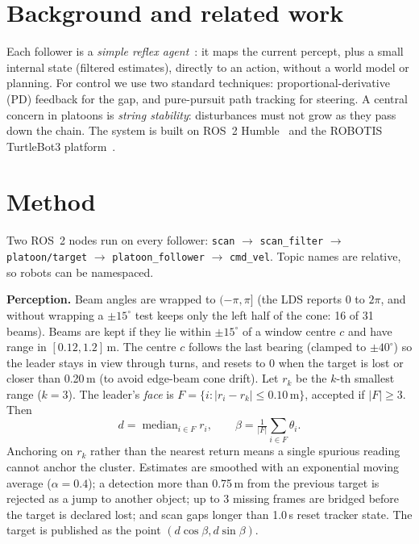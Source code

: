 \documentclass[11pt,a4paper,twocolumn]{article}
\begin{document}
\section{Background and related work}
Each follower is a \emph{simple reflex agent}~\cite{russell2021aima}: it maps the current
percept, plus a small internal state (filtered estimates), directly to an action, without a
world model or planning. For control we use two standard techniques: proportional-derivative
(PD) feedback for the gap, and pure-pursuit path tracking for steering. A central concern in
platoons is \emph{string stability}: disturbances must not grow as they pass down the chain.
The system is built on ROS~2 Humble~\cite{ros2docs} and the ROBOTIS TurtleBot3
platform~\cite{turtlebot3manual}.

\section{Method}
Two ROS~2 nodes run on every follower:
\texttt{scan} $\rightarrow$ \texttt{scan\_filter} $\rightarrow$ \texttt{platoon/target}
$\rightarrow$ \texttt{platoon\_follower} $\rightarrow$ \texttt{cmd\_vel}.
Topic names are relative, so robots can be namespaced.

\textbf{Perception.} Beam angles are wrapped to $(-\pi,\pi]$ (the LDS reports $0$ to $2\pi$,
and without wrapping a $\pm15^\circ$ test keeps only the left half of the cone: 16 of 31
beams). Beams are kept if they lie within $\pm15^\circ$ of a window centre $c$ and have range
in $[0.12, 1.2]$\,m. The centre $c$ follows the last bearing (clamped to $\pm40^\circ$) so
the leader stays in view through turns, and resets to $0$ when the target is lost or closer
than 0.20\,m (to avoid edge-beam cone drift). Let $r_k$ be the $k$-th smallest range
($k{=}3$). The leader's \emph{face} is
$F=\{i : |r_i - r_k| \le 0.10\,\text{m}\}$, accepted if $|F|\ge3$. Then
\begin{equation}
  d=\operatorname{median}_{i\in F} r_i,\qquad
  \beta=\tfrac{1}{|F|}\textstyle\sum_{i\in F}\theta_i .
\end{equation}
Anchoring on $r_k$ rather than the nearest return means a single spurious reading cannot
anchor the cluster. Estimates are smoothed with an exponential moving average
($\alpha{=}0.4$); a detection more than 0.75\,m from the previous target is rejected as a
jump to another object; up to 3 missing frames are bridged before the target is declared
lost; and scan gaps longer than 1.0\,s reset tracker state. The target is published as the
point $(d\cos\beta, d\sin\beta)$.
\end{document}
